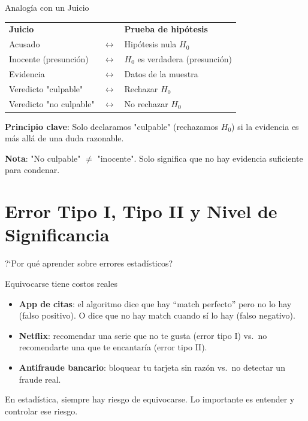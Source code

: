 \documentclass[aspectratio=169, 11pt]{beamer}
\begin{document}
\begin{frame}{Analogía con un Juicio}
\begin{center}
\begin{tabular}{lcl}
\textbf{Juicio} & & \textbf{Prueba de hipótesis} \\[0.3cm]
Acusado & $\longleftrightarrow$ & Hipótesis nula $H_0$ \\
Inocente (presunción) & $\longleftrightarrow$ & $H_0$ es verdadera (presunción) \\
Evidencia & $\longleftrightarrow$ & Datos de la muestra \\
Veredicto "culpable" & $\longleftrightarrow$ & Rechazar $H_0$ \\
Veredicto "no culpable" & $\longleftrightarrow$ & No rechazar $H_0$ \\
\end{tabular}
\end{center}

\vspace{0.5cm}
\textbf{Principio clave}: Solo declaramos "culpable" (rechazamos $H_0$) si la evidencia es \alert{más allá de una duda razonable}.

\vspace{0.3cm}
\textbf{Nota}: "No culpable" $\neq$ "inocente". Solo significa que no hay evidencia suficiente para condenar.
\end{frame}

\section{Error Tipo I, Tipo II y Nivel de Significancia}

\begin{frame}{?`Por qu\'e aprender sobre errores estad\'isticos?}
\small
\begin{exampleblock}{Equivocarse tiene costos reales}
\begin{itemize}\setlength{\itemsep}{2pt}
  \item \textbf{App de citas}: el algoritmo dice que hay ``match perfecto'' pero no lo hay (falso positivo). O dice que no hay match cuando s\'i lo hay (falso negativo).
  \item \textbf{Netflix}: recomendar una serie que no te gusta (error tipo I) vs.\ no recomendarte una que te encantar\'ia (error tipo II).
  \item \textbf{Antifraude bancario}: bloquear tu tarjeta sin raz\'on vs.\ no detectar un fraude real.
\end{itemize}
\end{exampleblock}

\vspace{0.2cm}
En estad\'istica, \alert{siempre} hay riesgo de equivocarse. Lo importante es entender y controlar ese riesgo.
\end{frame}
\end{document}
